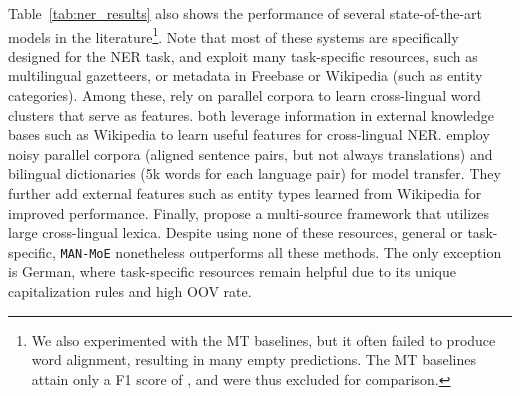 \documentclass[11pt,a4paper]{article}
\newcommand{\manmoe}{\texttt{MAN-MoE}}
\begin{document}
Table~\ref{tab:ner_results} also shows the performance of several state-of-the-art models in the literature\footnote{We also experimented with the MT baselines, but it often failed to produce word alignment, resulting in many empty predictions. The MT baselines attain only a F1 score of , and were thus excluded for comparison.}.
Note that most of these systems are specifically designed for the NER task, and exploit many task-specific resources, such as multilingual gazetteers, or metadata in Freebase or Wikipedia (such as entity categories).
Among these, \citet{N12-1052} rely on parallel corpora to learn cross-lingual word clusters that serve as features.
\citet{Nothman:2013:LMN:2405838.2405915,K16-1022} both leverage information in external knowledge bases such as Wikipedia to learn useful features for cross-lingual NER.
\citet{P17-1135} employ noisy parallel corpora (aligned sentence pairs, but not always translations) and bilingual dictionaries (5k words for each language pair) for model transfer.
They further add external features such as entity types learned from Wikipedia for improved performance.
Finally, \citet{D17-1269} propose a multi-source framework that utilizes large cross-lingual lexica.
Despite using none of these resources, general or task-specific, \manmoe{} nonetheless outperforms all these methods.
The only exception is German, where task-specific resources remain helpful due to its unique capitalization rules and high OOV rate.
\end{document}
